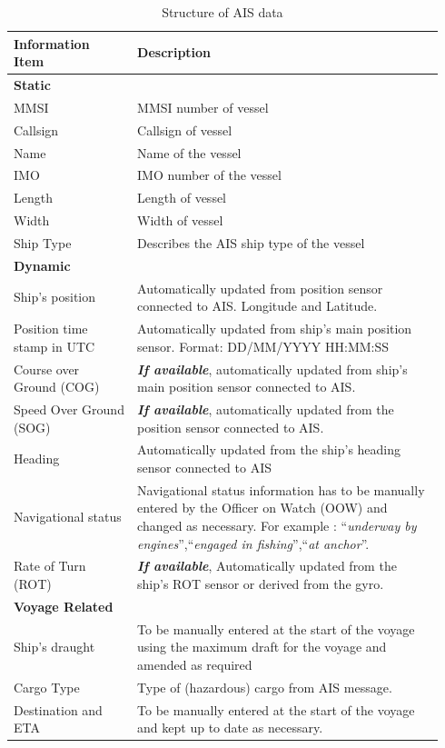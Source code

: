 \begin{table}[h!]
    \footnotesize
    \centering
    {\begin{tabular}{ p{0.27\linewidth} p{0.67\linewidth}  }
    \hline
    \textbf{Information Item} & \textbf{Description} \\
    \hline
    \multicolumn{2}{l}{\textbf{Static}}\\
    \hline
    MMSI & MMSI number of vessel\\
    Callsign & Callsign of vessel \\
    Name & Name of the vessel \\
    IMO & IMO number of the vessel \\
    Length & Length of vessel \\
    Width & Width of vessel \\
    Ship Type & Describes the AIS ship type of the vessel \\
    \hline
    \multicolumn{2}{l}{\textbf{Dynamic}}\\
    \hline
    Ship's position & Automatically updated from position sensor connected to AIS. Longitude and Latitude.\\
    Position time stamp in UTC & Automatically updated from ship's main position sensor. Format: DD\slash MM\slash YYYY HH:MM:SS\\
    Course over Ground (COG) & \emph{\textbf{If available}}, automatically updated from ship's main position sensor connected to AIS.\\  
    Speed Over Ground (SOG) & \emph{\textbf{If available}}, automatically updated from the position sensor connected to AIS.\\
    Heading & Automatically updated from the ship's heading sensor connected to AIS\\
    Navigational status & Navigational status information has to be manually entered by the Officer on Watch (OOW) and changed as necessary. For example : ``\emph{underway by engines}'',``\emph{engaged in fishing}'',``\emph{at anchor}''.\\
    Rate of Turn (ROT) & \emph{\textbf{If available}}, Automatically updated from the ship's ROT sensor or derived from
    the gyro.\\
    \hline
    \multicolumn{2}{l}{\textbf{Voyage Related}}\\
    \hline
    Ship's draught & To be manually entered at the start of the voyage using the maximum draft for the voyage and amended as required \\
    Cargo Type & Type of (hazardous) cargo from AIS message.\\
    Destination and ETA & To be manually entered at the start of the voyage and kept up to
    date as necessary.\\
    \hline
    \end{tabular}}
\caption{Structure of AIS data }\label{tbl:AIS_struct}
\end{table}

